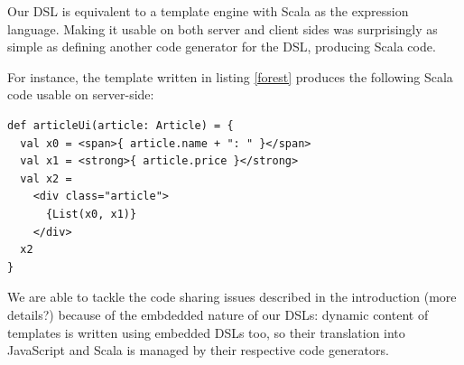 \documentclass[preprint]{sigplanconf}
\begin{document}
Our DSL is equivalent to a template engine with Scala as the expression language. Making it usable on both server and
client sides was surprisingly as simple as defining another code generator for the DSL, producing Scala code.

For instance, the template written in listing \ref{forest} produces the following Scala code usable on
server-side:

\begin{lstlisting}
def articleUi(article: Article) = {
  val x0 = <span>{ article.name + ": " }</span>
  val x1 = <strong>{ article.price }</strong>
  val x2 =
    <div class="article">
      {List(x0, x1)}
    </div>
  x2
}
\end{lstlisting}

We are able to tackle the code sharing issues described in the introduction (more details?) because of the embdedded
nature of our DSLs: dynamic content of templates is written using embedded DSLs too, so their translation into
JavaScript and Scala is managed by their respective code generators.
\end{document}
